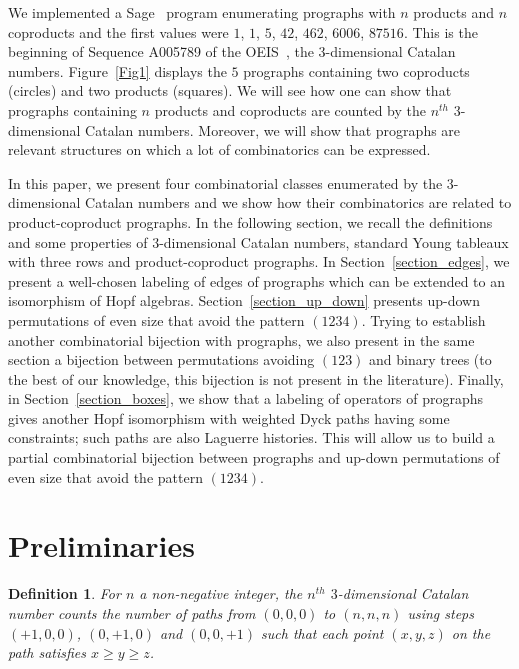 \documentclass{amsart}
\newtheorem{definition}[theorem]{Definition}
\begin{document}
We implemented a Sage~\cite{sage} program enumerating
prographs with $n$ products and $n$ coproducts and the first
values were $1$, $1$, $5$, $42$, $462$, $6006$, $87516$. This is
the beginning of Sequence A005789 of the
OEIS~\cite{Sloane}, the $3$-dimensional Catalan numbers.
Figure~\ref{Fig1} displays the 
$5$ prographs containing two coproducts (circles) and two products
(squares). We will see how one can show that prographs containing
$n$ products and coproducts are counted by the $n^{th}$
$3$-dimensional Catalan numbers. Moreover, we will show that prographs
are relevant structures on which a lot of combinatorics can be expressed.


In this paper, we present four combinatorial classes
enumerated by the $3$-dimensional Catalan numbers and we show how their
combinatorics are related to product-coproduct prographs. In the
following section, we recall the definitions and some properties of
$3$-dimensional Catalan numbers, standard Young tableaux with three rows and
product-coproduct prographs.
In Section~\ref{section_edges}, we present a well-chosen labeling of
edges of prographs which can be extended to an isomorphism of Hopf
algebras. Section~\ref{section_up_down} presents up-down permutations
of even size that avoid the pattern $(1234)$. Trying to establish another
combinatorial bijection with prographs, we also present in the same
section a bijection between permutations avoiding $(123)$ and binary
trees (to the best of our knowledge, this bijection is not present in
the literature). Finally, in Section~\ref{section_boxes}, we show that
a labeling of operators of prographs gives another Hopf isomorphism
with weighted Dyck paths having some constraints; such paths are
also Laguerre histories. This will allow us to build a
partial combinatorial bijection between prographs and up-down
permutations of even size that avoid the pattern $(1234)$.


\section{Preliminaries}


\begin{definition}
  For $n$ a non-negative integer, the $n^{th}$ $3$-dimensional Catalan
  number counts the number of paths from $(0,0,0)$ to $(n,n,n)$ using
  steps $(+1,0,0)$, $(0,+1,0)$ and $(0,0,+1)$ such that each point
  $(x,y,z)$ on the path satisfies $x \geqslant y \geqslant z$.
\end{definition}
\end{document}
